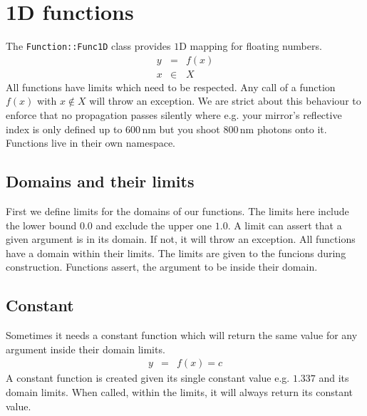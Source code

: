 \chapter{1D functions}
\newcommand{\la}{\lambda}
%
The \lstinline{Function::Func1D} class provides $1$D mapping for floating numbers.
%
\begin{eqnarray}
    y &=& f(x)\\
    x &\in& X
\end{eqnarray}
%
All functions have limits which need to be respected. Any call of a function $f(x)$ with $x \notin X$ will throw an exception. We are strict about this behaviour to enforce that no propagation passes silently where e.g. your mirror's reflective index is only defined up to $600\,$nm but you shoot $800\,$nm photons onto it. Functions live in their own namespace.
%
\section{Domains and their limits}
%
First we define limits for the domains of our functions.
%
%
The limits here include the lower bound $0.0$ and exclude the upper one $1.0$. A limit can assert that a given argument is in its domain. If not, it will throw an exception.
%
%
All functions have a domain within their limits. The limits are given to the funcions during construction.
%
%
Functions assert, the argument to be inside their domain.
%
\section{Constant}
%
Sometimes it needs a constant function which will return the same value for any argument inside their domain limits.
%
\begin{eqnarray}
    y &=& f(x) = c
\end{eqnarray}
%
A constant function is created given its single constant value e.g. $1.337$ and its domain limits.
%
%
When called, within the limits, it will always return its constant value.
%
